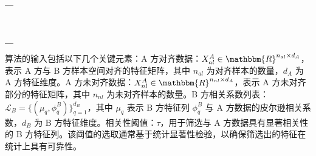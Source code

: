 \vspace{-0.2cm} 
\begin{table}[H]
	\centering
	\renewcommand{\arraystretch}{1.0}
	{\songti \wuhao
	\begin{tabular}{p{13.2cm}}
		\toprule[1.5pt]
		\makecell[l]{\songti\wuhao  算法 4-1 纵向联邦半监督方法生成数据过程}\\
		\midrule[0.75pt]
		\makecell[l]{\wuhao \textbf{输入:} A方对齐数据集 $X_{al}^A$, 未标记数据集 $X_{nl}^A$,B 方特性相关性列表 $\mathcal{L}_B$}\\
		\makecell[l]{\wuhao \quad 对齐数据集样本数量 $n_{al}$，标记数据集的样本数量 $n_{nl}$，相关性阈值 $\tau$}\\
		\makecell[l]{\wuhao \textbf{输出:} $X^{B_{predict}}$: 最终通过预测方法生成的B方数据}\\
		\makecell[l]{\wuhao \textbf{Process:}}\\
		\makecell[l]{\wuhao 1: Initialize $X^{B_{predict}} = \emptyset$, $\mathcal{L}_B^{\text{predict}} = \{(\mu_q, \phi^B_q) \in \mathcal{L}_B \mid u_q > \tau\}$}\\
		\makecell[l]{\wuhao 2: \textbf{for} $(\mu_q, \phi^B_q) \in \mathcal{L}_B^{\text{predict}}$ \textbf{do}}\\
		\makecell[l]{\wuhao 3: \quad $X_{al}^{B_{predict}} = \{x_{i}^{B_{predict}}\}_{i=1}^{n_{al}}$}\\
		\makecell[l]{\wuhao 4: \quad $X_{nl}^{B_{predict}} = \{x_{i}^{B_{predict}}\}_{i=n_{al}+1}^{n_{al}+n_{nl}}$}\\
		\makecell[l]{\wuhao 5: \quad $p = \text{VFPU-M}(X_{al}^A, X_{nl}^A, X_{al}^{B_{predict}}, X_{nl}^{B_{predict}}, \phi^B_q)$}\\
		\makecell[l]{\wuhao 6: \quad $X^{B_{predict}} = X^{B_{predict}} \cup \{p\}$}\\
		\makecell[l]{\wuhao 7: \textbf{end for}}\\
		\makecell[l]{\wuhao 8: 得到 $X^{B_{predict}}$}\\
		\bottomrule[1.5pt]
	\end{tabular}
}
	\label{tab:algo-vfpu}
\end{table}
\vspace{-0.56cm}
算法的输入包括以下几个关键元素：A 方对齐数据：$X_{al}^A \in \mathbbm{R}^{n_{al} \times d_A}$，表示 A 方与 B 方样本空间对齐的特征矩阵，其中 $n_{al}$ 为对齐样本的数量，$d_A$ 为 A 方特征维度。A 方未对齐数据：$X_{nl}^A \in \mathbbm{R}^{n_{nl} \times d_A}$，表示 A 方未对齐部分的特征矩阵，其中 $n_{nl}$ 为未对齐样本的数量。B 方相关系数列表：$\mathcal{L}_B = \{(\mu_q, \phi^B_q)\}_{q=1}^{d_B}$，其中 $\mu_q$ 表示 B 方特征列 $\phi^B_q$ 与 A 方数据的皮尔逊相关系数，$d_B$ 为 B 方特征维度。相关性阈值：$\tau$，用于筛选与 A 方数据具有显著相关性的 B 方特征列。该阈值的选取通常基于统计显著性检验，以确保筛选出的特征在统计上具有可靠性。

